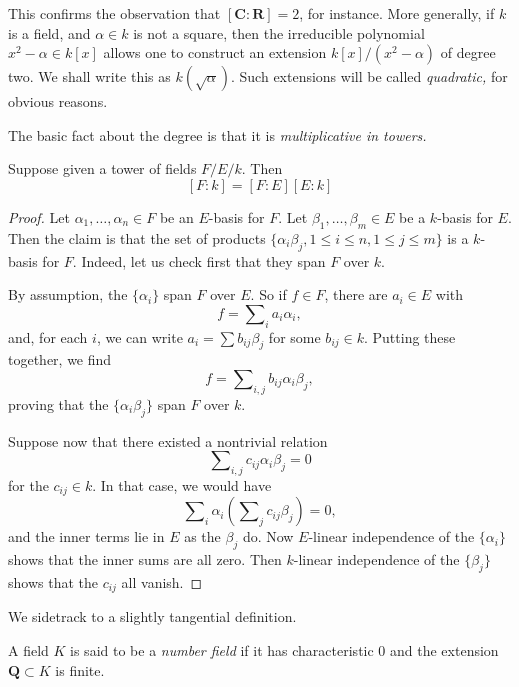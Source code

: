 \noindent
This confirms the observation that $[\mathbf{C}: \mathbf{R}] = 2$, for
instance. More generally, if $k$ is a field, and $\alpha \in k$ is not a
square, then the irreducible polynomial $x^2 - \alpha \in k[x]$ allows one
to construct an extension $k[x]/(x^2 - \alpha)$ of degree two.
We shall write this as $k(\sqrt{\alpha})$. Such extensions will be called
{\it quadratic,} for obvious reasons.

\medskip\noindent
The basic fact about the degree is that it is {\it multiplicative in towers.}

\begin{lemma}[Multiplicativity]
\label{lemma-multiplicativity-degrees}
Suppose given a tower of fields $F/E/k$. Then
$$
[F:k] = [F:E][E:k]
$$
\end{lemma}

\begin{proof}
Let $\alpha_1, \dots, \alpha_n \in F$ be an $E$-basis for $F$. Let
$\beta_1, \dots, \beta_m \in E$ be a $k$-basis for $E$. Then the claim is
that the set of products
$\{\alpha_i \beta_j, 1 \leq i \leq n, 1 \leq j \leq m\}$
is a $k$-basis for $F$. Indeed, let us check first that they span $F$ over $k$.

\medskip\noindent
By assumption, the $\{\alpha_i\}$ span $F$ over $E$. So if
$f \in F$, there are $a_i \in E$ with
$$
f = \sum\nolimits_i a_i \alpha_i,
$$
and, for each $i$, we can write $a_i = \sum b_{ij} \beta_j$ for some
$b_{ij} \in k$. Putting these together, we find
$$
f = \sum\nolimits_{i,j} b_{ij} \alpha_i \beta_j,
$$
proving that the $\{\alpha_i \beta_j\}$ span $F$ over $k$.

\medskip\noindent
Suppose now that there existed a nontrivial relation
$$
\sum\nolimits_{i,j} c_{ij} \alpha_i \beta_j = 0
$$
for the $c_{ij} \in k$. In that case, we would have
$$
\sum\nolimits_i \alpha_i \left( \sum\nolimits_j c_{ij} \beta_j \right) = 0,
$$
and the inner terms lie in $E$ as the $\beta_j$ do. Now $E$-linear
independence of the $\{\alpha_i\}$ shows that the inner sums are all zero.
Then $k$-linear independence of the $\{\beta_j\}$ shows that the
$c_{ij}$ all vanish.
\end{proof}

\noindent
We sidetrack to a slightly tangential definition.

\begin{definition}
\label{definition-number-field}
A field $K$ is said to be a {\it number field} if it has characteristic
$0$ and the extension $\mathbf{Q} \subset K$ is finite.
\end{definition}

